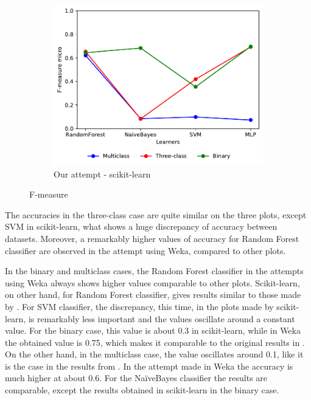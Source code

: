 \begin{figure}[H]
\begin{subfigure}[t]{0.4\textwidth}
        \includegraphics[width=\linewidth, page = 3]{images/fmeasure}
        \caption{Our attempt - scikit-learn}
    \end{subfigure}  
    \caption{F-measure}
    \label{fig:f1}
\end{figure}

The accuracies in the three-class case are quite similar on the three plots, except SVM in scikit-learn, what shows a huge discrepancy of accuracy between datasets. Moreover, a remarkably higher values of accuracy for Random Forest classifier are observed in the attempt using Weka, compared to other plots.

In the binary and multiclass cases, the Random Forest classifier in the attempts using Weka always shows higher values comparable to other plots. Scikit-learn, on other hand, for Random Forest classifier, gives results similar to those made by \cite{borges_hink_machine_2014-1}. For SVM classifier, the discrepancy, this time, in the plots made by scikit-learn, is remarkably less important and the values oscillate around a constant value. For the binary case, this value is about 0.3 in scikit-learn, while in Weka the obtained value is 0.75, which makes it comparable to the original results in \cite{borges_hink_machine_2014-1}. On the other hand, in the multiclass case, the value oscillates around 0.1, like it is the case in the results from \cite{borges_hink_machine_2014-1}. In the attempt made in Weka the accuracy is much higher at about 0.6. For the NaïveBayes classifier the results are comparable, except the results obtained in scikit-learn in the binary case.

